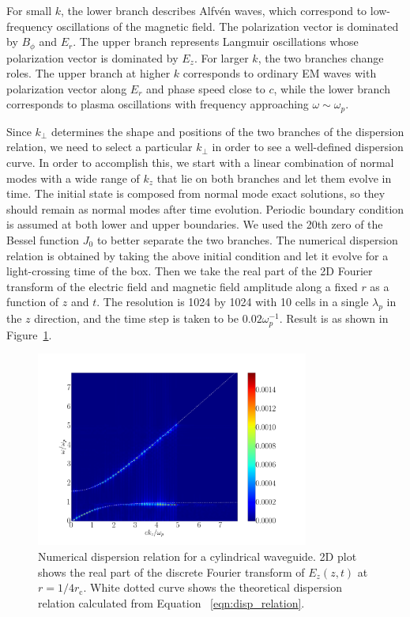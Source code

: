 For small $k$, the lower branch describes Alfv\'en waves, which correspond to
low-frequency oscillations of the magnetic field. The polarization vector is
dominated by $B_\phi$ and $E_r$. The upper branch represents Langmuir
oscillations whose polarization vector is dominated by $E_z$. For larger $k$,
the two branches change roles. The upper branch at higher $k$ corresponds to
ordinary EM waves with polarization vector along $E_r$ and phase speed close to
$c$, while the lower branch corresponds to plasma oscillations with frequency
approaching $\omega\sim \omega_p$.

Since $k_\perp$ determines the shape and positions of the two branches of the
dispersion relation, we need to select a particular $k_\perp$ in order to see a
well-defined dispersion curve. In order to accomplish this, we start with a
linear combination of normal modes with a wide range of $k_z$ that lie on both
branches and let them evolve in time. The initial state is composed from normal
mode exact solutions, so they should remain as normal modes after time
evolution. Periodic boundary condition is assumed at both lower and upper
boundaries. We used the 20th zero of the Bessel function $J_0$ to better
separate the two branches. The numerical dispersion relation is obtained by
taking the above initial condition and let it evolve for a light-crossing time
of the box. Then we take the real part of the 2D Fourier transform of the
electric field and magnetic field amplitude along a fixed $r$ as a function of
$z$ and $t$. The resolution is 1024 by 1024 with 10 cells in a single
$\lambda_p$ in the $z$ direction, and the time step is taken to be
$0.02\omega_p^{-1}$. Result is as shown in Figure~\ref{fig:disp_numerical}.
\begin{figure}[h]
    \centering
    \includegraphics[width=0.8\textwidth]{pics/chap1/disp.png}
    \caption[Numerical dispersion relation for cylindrical waveguide.]{Numerical
      dispersion relation for a cylindrical waveguide. 2D plot shows the real
      part of the discrete Fourier transform of $E_z(z,t)$ at $r =
      1/4r_\mathrm{c}$. White dotted curve shows the theoretical dispersion
      relation calculated from Equation~ \eqref{eqn:disp_relation}.}
    \label{fig:disp_numerical}
\end{figure}

